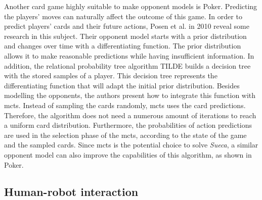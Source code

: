 Another card game highly suitable to make opponent models is Poker.
Predicting the players' moves can naturally affect the outcome of this game.
In order to predict players' cards and their future actions, Posen et al. in 2010 reveal some research in this subject.
Their opponent model starts with a prior distribution and changes over time with a differentiating function.
The prior distribution allows it to make reasonable predictions while having insufficient information.
In addition, the relational probability tree algorithm TILDE builds a decision tree with the stored samples of a player.
This decision tree represents the differentiating function that will adapt the initial prior distribution.
Besides modelling the opponents, the authors present how to integrate this function with \gls{mcts}.
Instead of sampling the cards randomly, \gls{mcts} uses the card predictions.
Therefore, the algorithm does not need a numerous amount of iterations to reach a uniform card distribution.
Furthermore, the probabilities of action predictions are used in the selection phase of the \gls{mcts}, according to the state of the game and the sampled cards.
Since \gls{mcts} is the potential choice to solve \emph{Sueca}, a similar opponent model can also improve the capabilities of this algorithm, as shown in Poker.


 

\subsection{Human-robot interaction}